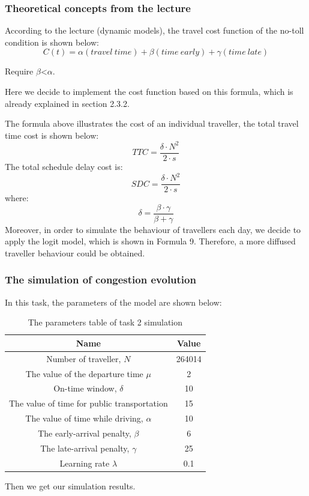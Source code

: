\documentclass[a4paper, 12pt,oneside]{article}
\begin{document}
\subsubsection{Theoretical concepts from the lecture}
According to the lecture (dynamic models), the travel cost function of the no-toll condition is shown below:
\begin{equation}
    C(t)=\alpha(travel\ time)+\beta(time \ early)+\gamma(time\ late)
\end{equation}

Require $\beta$<$\alpha$.

Here we decide to implement the cost function based on this formula, which is already explained in section 2.3.2.

The formula above illustrates the cost of an individual traveller, the total travel time cost is shown below:
\begin{equation}
    TTC=\frac{\delta \cdot N^{2}}{2\cdot s }
\end{equation}
The total schedule delay cost is:
\begin{equation}
    SDC = \frac{\delta \cdot N^{2}}{2\cdot s }
\end{equation}
where:
\begin{equation}
    \delta=\frac{\beta \cdot \gamma}{\beta+\gamma}
\end{equation}
Moreover, in order to simulate the behaviour of travellers each day, we decide to apply the logit model, which is shown in Formula 9. Therefore, a more diffused traveller behaviour could be obtained. 


\subsubsection{The simulation of congestion evolution}

In this task, the parameters of the model are shown below:

\begin{table}[]
    \centering
    \begin{tabular}{c|c}
        Name & Value \\
        \hline
        Number of traveller, $N$& 264014\\
        The value of the departure time $\mu$ & 2\\
        On-time window, $\delta$ & 10\\
        The value of time for public transportation & 15\\
        The value of time while driving, $\alpha$ & 10\\
        The early-arrival penalty, $\beta$ & 6\\
        The late-arrival penalty, $\gamma$ & 25\\
        Learning rate $\lambda$ & 0.1\\
        
    \end{tabular}
    \caption{The parameters table of task 2 simulation}
    \label{tab:The parameters table of task 2 simulation}
\end{table}
Then we get our simulation results.
\end{document}
